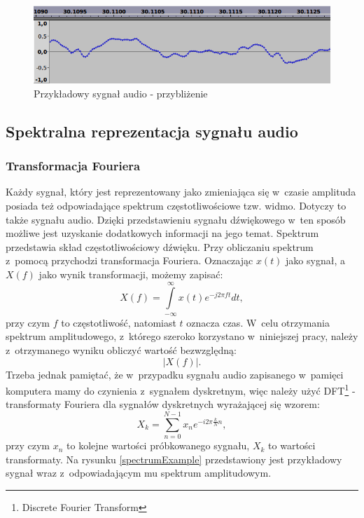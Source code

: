 \begin{figure}[ht!]
\centering
\includegraphics[scale=0.5]{res/exampleAudio2.png}
\caption{Przykładowy sygnał audio - przybliżenie\label{audioExample2}}
\end{figure}

\subsection{Spektralna reprezentacja sygnału audio}
\subsubsection{Transformacja Fouriera}
Każdy sygnał, który jest reprezentowany jako zmieniająca się w~czasie amplituda posiada też odpowiadające spektrum częstotliwościowe tzw. widmo. Dotyczy to także sygnału audio. Dzięki przedstawieniu sygnału dźwiękowego w~ten sposób możliwe jest uzyskanie dodatkowych informacji na jego temat\cite{windowingNI}. Spektrum przedstawia skład częstotliwościowy dźwięku. Przy obliczaniu spektrum z~pomocą przychodzi transformacja Fouriera. Oznaczając $x(t)$ jako sygnał, a~$X(f)$ jako wynik transformacji, możemy zapisać:
\begin{equation}
X(f)=\int\limits_{-\infty}^{\infty} x(t)e^{-j2\pi ft} dt ,
\end{equation}
przy czym $f$ to częstotliwość, natomiast $t$ oznacza czas. W~celu otrzymania spektrum amplitudowego, z~którego szeroko korzystano w~niniejszej pracy, należy z~otrzymanego wyniku obliczyć wartość bezwzględną:
\begin{equation}
|X(f)|.
\end{equation}
Trzeba jednak pamiętać, że w~przypadku sygnału audio zapisanego w~pamięci komputera mamy do czynienia z~sygnałem dyskretnym, więc należy użyć DFT\footnote{Discrete Fourier Transform} - transformaty Fouriera dla sygnałów dyskretnych wyrażającej się wzorem:
\begin{equation}
X_k = \sum_{n=0}^{N-1}x_n e^{-i2\pi\frac{k}{N}n} ,
\end{equation}
przy czym $x_n$ to kolejne wartości próbkowanego sygnału, $X_k$ to wartości transformaty. Na rysunku \ref{spectrumExample} przedstawiony jest przykładowy sygnał wraz z~odpowiadającym mu spektrum amplitudowym.

